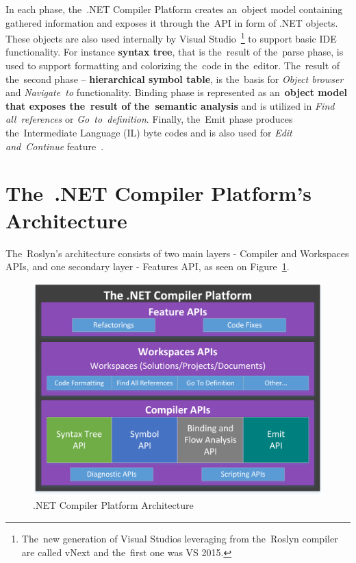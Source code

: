 \documentclass[
  digital, %
  table,   %
  lof,     %
  lot,     %
  oneside,
]{fithesis3}
\begin{document}
In each phase, the~.NET Compiler Platform creates an~object model containing gathered information and exposes it through the~API in form of .NET objects. These objects are also used internally by Visual Studio~\footnote{The~new generation of Visual Studios leveraging from the~Roslyn compiler are called vNext and the~first one was VS 2015.} to support basic IDE functionality. For instance \textbf{syntax tree}, that is the~result of the~parse phase, is used to support formatting and colorizing the~code in the~editor. The~result of the~second phase -- \textbf{hierarchical symbol table}, is the~basis for \textit{Object browser} and \textit{Navigate~to} functionality. Binding phase is represented as an~\textbf{object model that exposes the~result of the~semantic analysis} and is utilized in \textit{Find all~references} or \textit{Go~to~definition}. Finally, the~Emit phase produces the~Intermediate Language (IL) byte codes and is also used for \textit{Edit and~Continue} feature~\cite{roslyn-overview}.

\section{The~.NET Compiler Platform's Architecture}
The~Roslyn's architecture consists of two main layers - Compiler and Workspaces APIs, and one secondary layer - Features API, as seen on Figure~\ref{fig:roslyn-compiler-architecture}.

\begin{figure}[h!]
		\centering
			\includegraphics[scale=0.85]{img/roslyn-compiler-architecture}
		\caption{.NET Compiler Platform Architecture~\cite{roslyn-succinctly}}
		\label{fig:roslyn-compiler-architecture}
\end{figure}
\end{document}
